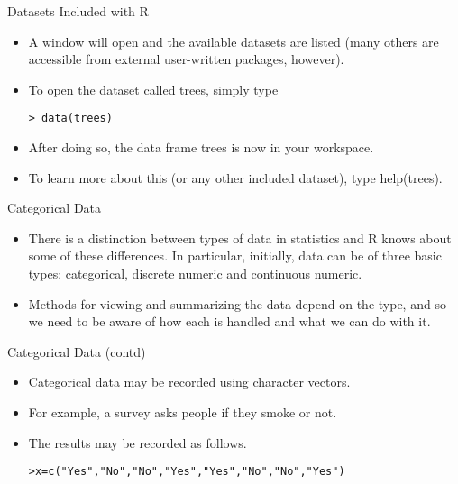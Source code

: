 \documentclass[pdf,default,slideColor,colorBG]{prosper}
\begin{document}

\begin{slide}{Datasets Included with R}
\begin{itemize}
\item A window will open and the available datasets are listed (many others are accessible from
external user-written packages, however). \item To open the dataset called trees, simply type

\begin{verbatim}
> data(trees)
\end{verbatim}

\item After doing so, the data frame trees is now in your workspace. \item  To learn more about this (or
any other included dataset), type help(trees).
\end{itemize}
\end{slide}


\begin{slide}{Categorical Data}
\begin{itemize}
\item 
There is a distinction between types of data in statistics and R knows about some of these differences. In particular,
initially, data can be of three basic types: categorical, discrete numeric and continuous numeric. \item Methods for viewing
and summarizing the data depend on the type, and so we need to be aware of how each is handled and what we can
do with it.
\end{itemize}
\end{slide}


\begin{slide}{Categorical Data (contd)}
\begin{itemize}
\item Categorical data may be recorded using character vectors.
\item For example, a survey asks people if they smoke or not. \item The results may be recorded as follows.

\begin{verbatim}
>x=c("Yes","No","No","Yes","Yes","No","No","Yes")
\end{verbatim}
\end{itemize}
\end{slide}
\end{document}
